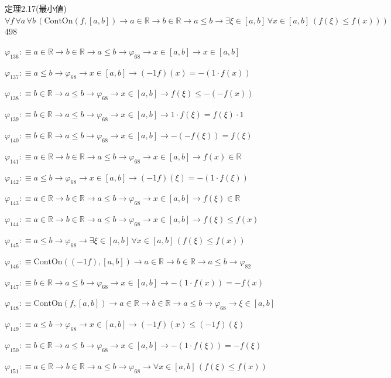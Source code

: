 \begin{fullproof}{定理2.17(最小値)}{$\forall f\,\forall a\,\forall b\,(\mathrm{ContOn}(f,[a,b]) \to a \in \mathbb{R} \to b \in \mathbb{R} \to a \leq b \to \exists \xi \in [a,b]\,\forall x \in [a,b]\,(f(\xi) \leq f(x)))$}{498}
\begin{abbrevlist}
\item $\varphi_{136} :\equiv a \in \mathbb{R} \to b \in \mathbb{R} \to a \leq b \to \varphi_{68} \to x \in [a,b] \to x \in [a,b]$
\item $\varphi_{137} :\equiv a \leq b \to \varphi_{68} \to x \in [a,b] \to (-1 f)(x) = -(1 \cdot f(x))$
\item $\varphi_{138} :\equiv b \in \mathbb{R} \to a \leq b \to \varphi_{68} \to x \in [a,b] \to f(\xi) \leq -(-f(x))$
\item $\varphi_{139} :\equiv b \in \mathbb{R} \to a \leq b \to \varphi_{68} \to x \in [a,b] \to 1 \cdot f(\xi) = f(\xi) \cdot 1$
\item $\varphi_{140} :\equiv b \in \mathbb{R} \to a \leq b \to \varphi_{68} \to x \in [a,b] \to -(-f(\xi)) = f(\xi)$
\item $\varphi_{141} :\equiv a \in \mathbb{R} \to b \in \mathbb{R} \to a \leq b \to \varphi_{68} \to x \in [a,b] \to f(x) \in \mathbb{R}$
\item $\varphi_{142} :\equiv a \leq b \to \varphi_{68} \to x \in [a,b] \to (-1 f)(\xi) = -(1 \cdot f(\xi))$
\item $\varphi_{143} :\equiv a \in \mathbb{R} \to b \in \mathbb{R} \to a \leq b \to \varphi_{68} \to x \in [a,b] \to f(\xi) \in \mathbb{R}$
\item $\varphi_{144} :\equiv a \in \mathbb{R} \to b \in \mathbb{R} \to a \leq b \to \varphi_{68} \to x \in [a,b] \to f(\xi) \leq f(x)$
\item $\varphi_{145} :\equiv a \leq b \to \varphi_{68} \to \exists \xi \in [a,b]\,\forall x \in [a,b]\,(f(\xi) \leq f(x))$
\item $\varphi_{146} :\equiv \mathrm{ContOn}((-1 f),[a,b]) \to a \in \mathbb{R} \to b \in \mathbb{R} \to a \leq b \to \varphi_{82}$
\item $\varphi_{147} :\equiv b \in \mathbb{R} \to a \leq b \to \varphi_{68} \to x \in [a,b] \to -(1 \cdot f(x)) = -f(x)$
\item $\varphi_{148} :\equiv \mathrm{ContOn}(f,[a,b]) \to a \in \mathbb{R} \to b \in \mathbb{R} \to a \leq b \to \varphi_{68} \to \xi \in [a,b]$
\item $\varphi_{149} :\equiv a \leq b \to \varphi_{68} \to x \in [a,b] \to (-1 f)(x) \leq (-1 f)(\xi)$
\item $\varphi_{150} :\equiv b \in \mathbb{R} \to a \leq b \to \varphi_{68} \to x \in [a,b] \to -(1 \cdot f(\xi)) = -f(\xi)$
\item $\varphi_{151} :\equiv a \in \mathbb{R} \to b \in \mathbb{R} \to a \leq b \to \varphi_{68} \to \forall x \in [a,b]\,(f(\xi) \leq f(x))$

\end{abbrevlist}
\end{fullproof}
